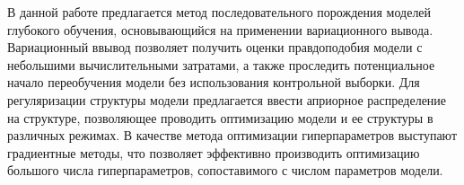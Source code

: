 В данной работе предлагается метод последовательного порождения моделей глубокого обучения, основывающийся на применении вариационного вывода. Вариационный ввывод позволяет получить оценки правдоподобия модели с небольшими вычислительными затратами, а также проследить потенциальное начало переобучения модели без использования контрольной выборки. Для регуляризации структуры модели предлагается ввести априорное распределение на структуре, позволяющее проводить оптимизацию модели и ее структуры в различных режимах. В качестве метода оптимизации гиперпараметров выступают градиентные методы, что позволяет эффективно производить оптимизацию большого числа гиперпараметров, сопоставимого с числом параметров модели. 

